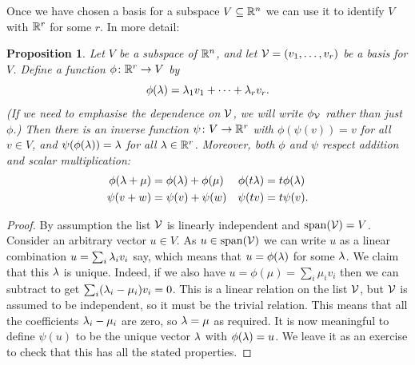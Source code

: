 \documentclass[reqno]{amsart}
\newtheorem{proposition}[theorem]{Proposition}
\theoremstyle{definition}
\begin{document}
Once we have chosen a basis for a subspace $V\subseteq{\mathbb{R}}^n$ we can use it
to identify $V$ with ${\mathbb{R}}^r$ for some $r$.  In more detail:

\begin{proposition}\label{prop-basis-iso}
 Let $V$ be a subspace of ${\mathbb{R}}^n$, and let $\mathcal{V}=(v_1,\dotsc,v_r)$ be a
 basis for $V$.  Define a function $\phi\colon{\mathbb{R}}^r\to V$ by
 \[ \phi(\lambda) = \lambda_1v_1 + \dotsb + \lambda_rv_r. \]
 (If we need to emphasise the dependence on $\mathcal{V}$, we will write
 $\phi_{\mathcal{V}}$ rather than just $\phi$.)  Then there is an inverse
 function $\psi\colon V\to{\mathbb{R}}^r$ with $\phi(\psi(v))=v$ for all $v\in V$,
 and $\psi(\phi(\lambda))=\lambda$ for all $\lambda\in{\mathbb{R}}^r$.  Moreover, both
 $\phi$ and $\psi$ respect addition and scalar multiplication:
 \begin{align*}
  \phi(\lambda+\mu) &= \phi(\lambda)+\phi(\mu) & \phi(t\lambda) &=t\phi(\lambda) \\
  \psi(v+w) &= \psi(v)+\psi(w) & \psi(tv) &= t\psi(v).
 \end{align*}
\end{proposition}
\begin{proof}
 By assumption the list $\mathcal{V}$ is linearly independent and
 $\operatorname{span}(\mathcal{V})=V$.   Consider an arbitrary vector $u\in V$.  As
 $u\in\operatorname{span}(\mathcal{V})$ we can write $u$ as a linear combination
 $u=\sum_i\lambda_iv_i$ say, which means that $u=\phi(\lambda)$ for some
 $\lambda$.  We claim that this $\lambda$ is unique.  Indeed, if we also have
 $u=\phi(\mu)=\sum_i\mu_iv_i$ then we can subtract to get
 $\sum_i(\lambda_i-\mu_i)v_i=0$.  This is a linear relation on the list
 $\mathcal{V}$, but $\mathcal{V}$ is assumed to be independent, so it must be the
 trivial relation.  This means that all the coefficients $\lambda_i-\mu_i$
 are zero, so $\lambda=\mu$ as required.  It is now meaningful to define
 $\psi(u)$ to be the unique vector $\lambda$ with $\phi(\lambda)=u$.  We leave
 it as an exercise to check that this has all the stated properties.
\end{proof}
\end{document}
